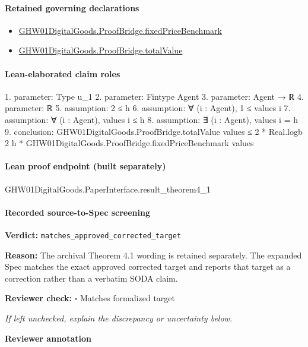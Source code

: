 \documentclass[10pt]{article}
\newcommand{\reviewerbox}{%
  \par\noindent\fbox{\parbox{0.96\linewidth}{\rule{0pt}{0.38in}}}\par
}
\newcommand{\reviewmatch}[1]{%
  \par\noindent\textbf{Reviewer check:} $\square$\; #1\par
  \noindent\emph{If left unchecked, explain the discrepancy or uncertainty below.}\par
}
\begin{document}
\paragraph{Retained governing declarations}
\begin{itemize}\raggedright
\item \hyperlink{governing-declaration-999c32dc6e9adaf2}{GHW01\allowbreak{}Digital\allowbreak{}Goods.\allowbreak{}Proof\allowbreak{}Bridge.\allowbreak{}fixed\allowbreak{}Price\allowbreak{}Benchmark}
\item \hyperlink{paper-prerequisite-1dad2de1fe153716}{GHW01\allowbreak{}Digital\allowbreak{}Goods.\allowbreak{}Proof\allowbreak{}Bridge.\allowbreak{}total\allowbreak{}Value}
\end{itemize}
\paragraph{Lean-elaborated claim roles}\begin{ReviewVerbatim}
1. parameter: Type u_1
2. parameter: Fintype Agent
3. parameter: Agent → ℝ
4. parameter: ℝ
5. assumption: 2 ≤ h
6. assumption: ∀ (i : Agent), 1 ≤ values i
7. assumption: ∀ (i : Agent), values i ≤ h
8. assumption: ∃ (i : Agent), values i = h
9. conclusion: GHW01DigitalGoods.ProofBridge.totalValue values ≤
  2 * Real.logb 2 h * GHW01DigitalGoods.ProofBridge.fixedPriceBenchmark values
\end{ReviewVerbatim}

\paragraph{Lean proof endpoint (built separately)}\begin{ReviewVerbatim}
GHW01DigitalGoods.PaperInterface.result_theorem4_1
\end{ReviewVerbatim}

\paragraph{Recorded source-to-Spec screening}
\textbf{Verdict:} \texttt{matches\_approved\_corrected\_target}
\\
{\raggedright
\textbf{Reason:} The archival Theorem 4.\allowbreak{}1 wording is retained separately.\allowbreak{} The expanded Spec matches the exact approved corrected target and reports that target as a correction rather than a verbatim SODA claim.\allowbreak{}
\par}
\reviewmatch{Matches formalized target}
\noindent\textbf{Reviewer annotation}\par
\reviewerbox
\clearpage
\hypertarget{source-claim-c584c5cb21438e15}{}
\end{document}
